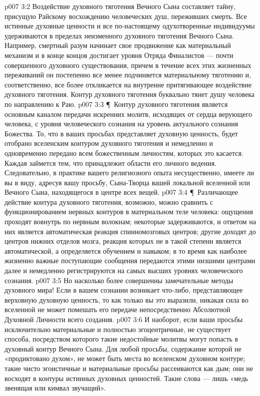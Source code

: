 \vs p007 3:2 Воздействие духовного тяготения Вечного Сына составляет тайну, присущую Райскому восхождению человеческих душ, переживших смерть. Все истинные духовные ценности и все по\hyp{}настоящему одухотворенные индивидуумы удерживаются в пределах неизменного духовного тяготения Вечного Сына. Например, смертный разум начинает свое продвижение как материальный механизм и в конце концов достигает уровня Отряда Финалистов --- почти совершенного духовного существования, причем в течение всех этих жизненных переживаний он постепенно все менее подчиняется материальному тяготению и, соответственно, все более откликается на внутренне притягивающее воздействие духовного тяготения. Контур духовного тяготения буквально тянет душу человека по направлению к Раю.
\vs p007 3:3 \P\ Контур духовного тяготения является основным каналом передачи искренних молитв, исходящих от сердца верующего человека, с уровня человеческого сознания на уровень актуального сознания Божества. То, что в ваших просьбах представляет духовную ценность, будет отобрано вселенским контуром духовного тяготения и немедленно и одновременно передано всем божественным личностям, которых это касается. Каждая займется тем, что принадлежит области его личного ведения. Следовательно, в практике вашего религиозного опыта несущественно, имеете ли вы в виду, адресуя вашу просьбу, Сына\hyp{}Творца вашей локальной вселенной или Вечного Сына, находящегося в центре всех вещей.
\vs p007 3:4 \P\ Различающее действие контура духовного тяготения, возможно, можно сравнить с функционированием нервных контуров в материальном теле человека: ощущения проходят вовнутрь по нервным волокнам; некоторые задерживаются, и ответом на них является автоматическая реакция спинномозговых центров; другие доходят до центров нижних отделов мозга, реакция которых не в такой степени является автоматической, а определяется обучением и навыком; в то время как наиболее жизненно важные поступающие сообщения передаются этими низшими центрами далее и немедленно регистрируются на самых высших уровнях человеческого сознания.
\vs p007 3:5 Но насколько более совершенны замечательные методы духовного мира! Если в вашем сознании возникает что\hyp{}либо, представляющее верховную духовную ценность, то как только вы это выразили, никакая сила во вселенной не может помешать его передаче непосредственно Абсолютной Духовной Личности всего создания.
\vs p007 3:6 И наоборот, если ваши просьбы исключительно материальные и полностью эгоцентричные, не существует способа, посредством которого такие недостойные молитвы могут попасть в духовный контур Вечного Сына. Для любой просьбы, содержание которой не «продиктовано духом», не может быть места во вселенском духовном контуре; такие чисто эгоистичные и материальные просьбы рассеиваются как дым; они не восходят в контуры истинных духовных ценностей. Такие слова --- лишь «медь звенящая или кимвал звучащий».
